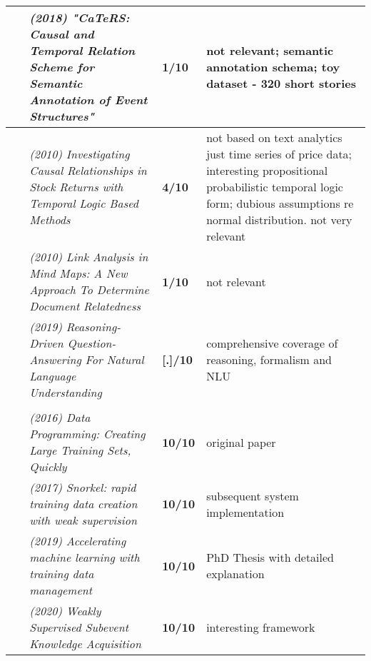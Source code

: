 \documentclass[10pt]{article}
\begin{document}
\begin{landscape}
\begin{longtable}{ |m{2em}|m{28em}|m{3em}|m{24em}| }
~\cite{2016_CaTeRS} & \emph{(2018) "{C}a{T}e{RS}: Causal and Temporal Relation Scheme for Semantic Annotation of Event Structures"}
& \textbf{1/10} & not relevant; semantic annotation schema; toy dataset - 320 short stories\\
 \hline 

~\cite{2010_causal} & \emph{(2010) Investigating Causal Relationships in Stock Returns with Temporal Logic Based Methods}
& \textbf{4/10} & not based on text analytics just time series of price data; interesting propositional probabilistic temporal logic form; dubious assumptions re normal distribution. not very relevant\\
 \hline 

~\cite{2010_linkanalysis} & \emph{(2010) Link Analysis in Mind Maps: A New Approach To Determine Document Relatedness}
& \textbf{1/10} & not relevant\\
 \hline 

~\cite{2019_reasoningQA} & \emph{(2019) Reasoning-Driven Question-Answering For Natural Language Understanding}
& \textbf{[.]/10} & comprehensive coverage of reasoning, formalism and NLU\\
 \hline 



\rowcolor{lightgray}\multicolumn{4}{|l|}{Inspiration} \\
 \hline 

~\cite{2016_dataprogramming} & \emph{(2016) Data Programming: Creating Large Training Sets, Quickly}
& \textbf{10/10} & original paper \\

~\cite{2017_snorkel} & \emph{(2017) Snorkel: rapid training data creation with weak supervision}
& \textbf{10/10} & subsequent system implementation\\
 
~\cite{2019_RatnerThesis} & \emph{(2019) Accelerating machine learning with training data management}
& \textbf{10/10} & PhD Thesis with detailed explanation\\
 \hline 
 

~\cite{2020_weaksupervision_subevent} & \emph{(2020) Weakly Supervised Subevent Knowledge Acquisition}
& \textbf{10/10} & interesting framework\\
 \hline 



\end{longtable}
\end{landscape}
\end{document}
